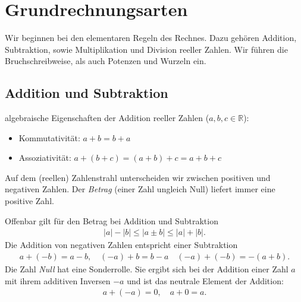 \thispagestyle{plain}
\section{Grundrechnungsarten}

Wir beginnen bei den elementaren Regeln des Rechnes. Dazu gehören Addition, Subtraktion, sowie Multiplikation und Division reeller Zahlen. Wir führen die Bruchschreibweise, als auch Potenzen und Wurzeln ein. 

\subsection{Addition und Subtraktion}
algebraische Eigenschaften der Addition reeller Zahlen ($a,b,c \in \mathbb{R}$):
\begin{itemize}
    \item Kommutativität: $a+b = b+a$
    \item Assoziativität: $a+(b+c) = (a+b)+c = a+b+c$
\end{itemize}

Auf dem (reellen) Zahlenstrahl unterscheiden wir zwischen positiven und negativen Zahlen. Der \emph{Betrag} (einer Zahl ungleich Null) liefert immer eine positive Zahl. 

\begin{figure}[htp]
    \centering
\end{figure}
Offenbar gilt für den Betrag bei Addition und Subtraktion 
\begin{align}
    |a|-|b| \le |a\pm b| \le |a|+|b|.
\end{align}
Die Addition von negativen Zahlen entspricht einer Subtraktion 
\begin{align}
    a+ (-b) = a-b, \quad (-a) + b = b-a \quad (-a)+(-b) = -(a+b).
\end{align}
Die Zahl \emph{Null} hat eine Sonderrolle. Sie ergibt sich bei der Addition einer Zahl $a$ mit ihrem additiven Inversen $-a$ und ist das neutrale Element der Addition:
\begin{align}
    a + (-a) = 0, \quad a + 0 = a.
\end{align}

